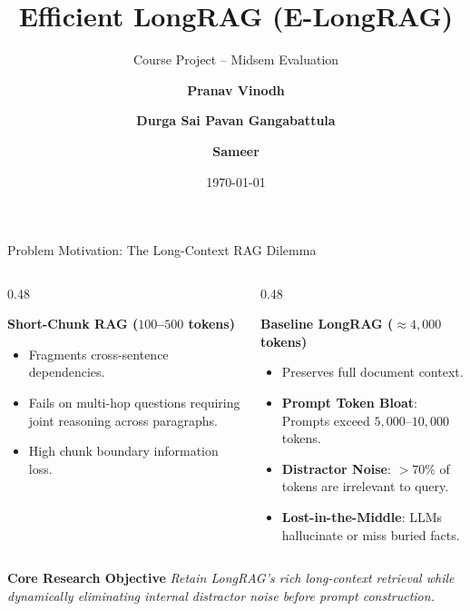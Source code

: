 \documentclass[10pt,aspectratio=169]{beamer}
\title[E-LongRAG: Course Project]{\textbf{Efficient LongRAG (E-LongRAG)}}
\subtitle{Course Project -- Midsem Evaluation}
\author[Pranav, Pavan, Sameer]{\textbf{Pranav Vinodh} \and \textbf{Durga Sai Pavan Gangabattula} \and \textbf{Sameer}}
\institute[Course: Large Language Models]{\textbf{Course: Large Language Models} \\ Final Year Undergraduate Project}
\date[\today]{\today}
\begin{document}
\begin{frame}
    \titlepage
\end{frame}

\begin{frame}{Problem Motivation: The Long-Context RAG Dilemma}
    \begin{columns}[onlytextwidth,T]
        \begin{column}{0.48\textwidth}
            \begin{block}{\textbf{Short-Chunk RAG ($100$--$500$ tokens)}}
                \begin{itemize}
                    \item Fragments cross-sentence dependencies.
                    \item Fails on multi-hop questions requiring joint reasoning across paragraphs.
                    \item High chunk boundary information loss.
                \end{itemize}
            \end{block}
        \end{column}
        
        \begin{column}{0.48\textwidth}
            \begin{block}{\textbf{Baseline LongRAG ($\approx 4,000$ tokens)}}
                \begin{itemize}
                    \item Preserves full document context.
                    \item \textbf{Prompt Token Bloat}: Prompts exceed $5,000$--$10,000$ tokens.
                    \item \textbf{Distractor Noise}: $>70\%$ of tokens are irrelevant to query.
                    \item \textbf{Lost-in-the-Middle}: LLMs hallucinate or miss buried facts.
                \end{itemize}
            \end{block}
        \end{column}
    \end{columns}
    
    \vspace{0.25cm}
    \begin{alertblock}{\textbf{Core Research Objective}}
        \textit{Retain LongRAG's rich long-context retrieval while dynamically eliminating internal distractor noise before prompt construction.}
    \end{alertblock}
\end{frame}
\end{document}
